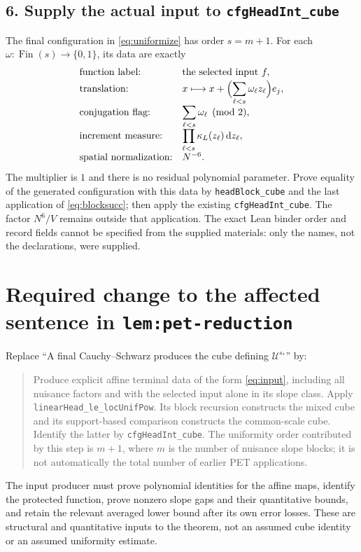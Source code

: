 \documentclass[11pt]{article}
\newcommand{\dd}{\,\mathrm d}
\newcommand{\idname}[1]{\nolinkurl{#1}}
\theoremstyle{definition}\newtheorem{definition}[lemma]{Definition}
\begin{document}
\subsection*{6. Supply the actual input to \texttt{cfgHeadInt\_cube}}
The final configuration in \eqref{eq:uniformize} has order $s=m+1$. For each $\omega:\operatorname{Fin}(s)\to\{0,1\}$, its data are exactly
\[
 \begin{array}{ll}
 \text{function label:}&\text{the selected input }f,\\[2pt]
 \text{translation:}&\displaystyle
       x\longmapsto x+\Bigl(\sum_{\ell<s}\omega_\ell z_\ell\Bigr)e_j,\\[4pt]
 \text{conjugation flag:}&\displaystyle\sum_{\ell<s}\omega_\ell\pmod2,\\[4pt]
 \text{increment measure:}&\displaystyle\prod_{\ell<s}\kappa_L(z_\ell)\dd z_\ell,\\[4pt]
 \text{spatial normalization:}&N^{-6}.
 \end{array}
\]
The multiplier is $1$ and there is no residual polynomial parameter. Prove equality of the generated configuration with this data by \idname{headBlock_cube} and the last application of \eqref{eq:blocksucc}; then apply the existing \idname{cfgHeadInt_cube}. The factor $N^6/V$ remains outside that application. The exact Lean binder order and record fields cannot be specified from the supplied materials: only the names, not the declarations, were supplied.

\section*{Required change to the affected sentence in \texttt{lem:pet-reduction}}
Replace ``A final Cauchy--Schwarz produces the cube defining $\mathcal U^{s_*}$'' by:

\begin{quote}
Produce explicit affine terminal data of the form \eqref{eq:input}, including all nuisance factors and with the selected input alone in its slope class. Apply \idname{linearHead_le_locUnifPow}. Its block recursion constructs the mixed cube and its support-based comparison constructs the common-scale cube. Identify the latter by \idname{cfgHeadInt_cube}. The uniformity order contributed by this step is $m+1$, where $m$ is the number of nuisance slope blocks; it is not automatically the total number of earlier PET applications.
\end{quote}

The input producer must prove polynomial identities for the affine maps, identify the protected function, prove nonzero slope gaps and their quantitative bounds, and retain the relevant averaged lower bound after its own error losses. These are structural and quantitative inputs to the theorem, not an assumed cube identity or an assumed uniformity estimate.
\end{document}
